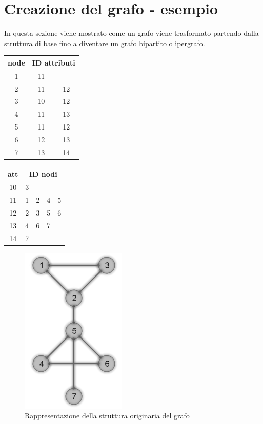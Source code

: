 \section{Creazione del grafo - esempio}
In questa sezione viene mostrato come un grafo viene trasformato partendo dalla struttura di base fino a diventare un grafo bipartito o ipergrafo.\\
%
\begin{multicols}{2}
	\begin{center}
		\begin{tabular}{|c|cc|}
		\hline
		node&\multicolumn{2}{c|}{ID attributi}\\
		\hline
		1&11&\\
		2&11&12\\
		3&10&12\\
		4&11&13\\
		5&11&12\\
		6&12&13\\
		7&13&14\\
		\hline
		\end{tabular}
		\label{tab:7_ID_to_att}
		\begin{tabular}{|c|cccc|}
		\hline
		att&\multicolumn{4}{c|}{ID nodi}\\
		\hline
		10&3&&&\\
		11&1&2&4&5\\
		12&2&3&5&6\\
		13&4&6&7&\\
		14&7&&&\\
		\hline
		\end{tabular}
		\label{tab:7_att_to_ID}
	\end{center}
\end{multicols}
%
%
\begin{figure}[htp]
	\centering
	\includegraphics{immagini/7transform_str}
	\caption{Rappresentazione della struttura originaria del grafo}
	\label{fig:7transform_str}
\end{figure}
